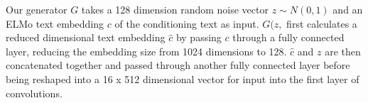 Our generator $G$ takes a 128 dimension random noise vector $z \sim N(0, 1)$ and an ELMo text embedding $c$ of the conditioning text as input. $G(z, $ first calculates a reduced dimensional text embedding $\hat{c}$ by passing $c$ through a fully connected layer, reducing the embedding size from 1024 dimensions to 128. $\hat{c}$ and $z$ are then concatenated together and passed through another fully connected layer before being reshaped into a 16 x 512 dimensional vector for input into the first layer of convolutions.